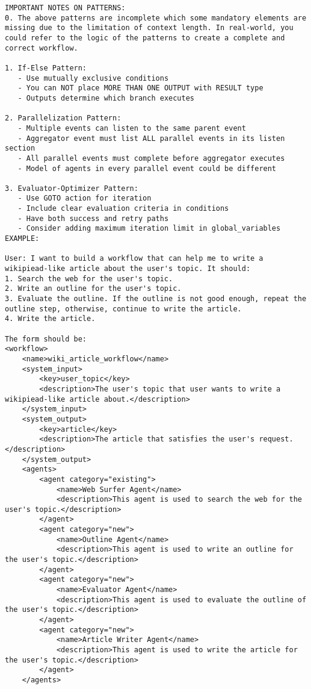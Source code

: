 \begin{lstlisting}
IMPORTANT NOTES ON PATTERNS:
0. The above patterns are incomplete which some mandatory elements are missing due to the limitation of context length. In real-world, you could refer to the logic of the patterns to create a complete and correct workflow.

1. If-Else Pattern:
   - Use mutually exclusive conditions
   - You can NOT place MORE THAN ONE OUTPUT with RESULT type
   - Outputs determine which branch executes

2. Parallelization Pattern:
   - Multiple events can listen to the same parent event
   - Aggregator event must list ALL parallel events in its listen section
   - All parallel events must complete before aggregator executes
   - Model of agents in every parallel event could be different

3. Evaluator-Optimizer Pattern:
   - Use GOTO action for iteration
   - Include clear evaluation criteria in conditions
   - Have both success and retry paths
   - Consider adding maximum iteration limit in global_variables
EXAMPLE:

User: I want to build a workflow that can help me to write a wikipiead-like article about the user's topic. It should:
1. Search the web for the user's topic.
2. Write an outline for the user's topic.
3. Evaluate the outline. If the outline is not good enough, repeat the outline step, otherwise, continue to write the article.
4. Write the article.

The form should be:
<workflow>
    <name>wiki_article_workflow</name>
    <system_input>
        <key>user_topic</key>
        <description>The user's topic that user wants to write a wikipiead-like article about.</description>
    </system_input>
    <system_output>
        <key>article</key>
        <description>The article that satisfies the user's request.</description>
    </system_output>
    <agents>
        <agent category="existing">
            <name>Web Surfer Agent</name>
            <description>This agent is used to search the web for the user's topic.</description>
        </agent>
        <agent category="new">
            <name>Outline Agent</name>
            <description>This agent is used to write an outline for the user's topic.</description>
        </agent>
        <agent category="new">
            <name>Evaluator Agent</name>
            <description>This agent is used to evaluate the outline of the user's topic.</description>
        </agent>
        <agent category="new">
            <name>Article Writer Agent</name>
            <description>This agent is used to write the article for the user's topic.</description>
        </agent>
    </agents>


\end{lstlisting}
